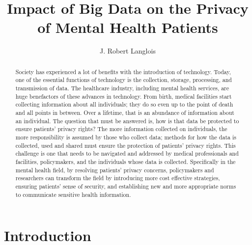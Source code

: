 \documentclass[sigconf]{acmart}
\begin{document}
\title{Impact of Big Data on the Privacy of  Mental Health Patients}


\author{J. Robert Langlois}

\begin{abstract}
Society has experienced a lot of benefits with the introduction of technology. Today, one of the essential functions of technology is the collection, storage, processing, and transmission of data. The healthcare industry, including mental health services, are huge benefactors of these advances in technology. From birth, medical facilities start collecting information about all individuals; they do so even up to the point of death and all points in between. Over a lifetime, that is an abundance of information about an individual. The question that must be answered is, how is that data be protected to ensure patients' privacy rights? The more information collected on individuals, the more responsibility is assumed by those who collect data; methods for how the data is collected, used and shared must ensure the protection of patients' privacy rights. This challenge is one that needs to be navigated and addressed by medical professionals and facilities, policymakers, and the individuals whose data is collected. Specifically in the mental health field, by resolving patients' privacy concerns, policymakers and researchers can transform the field by introducing more cost effective strategies, ensuring patients' sense of security, and establishing new and more appropriate norms to communicate sensitive health information.        
\end{abstract}


\maketitle

\section{Introduction}
\end{document}
